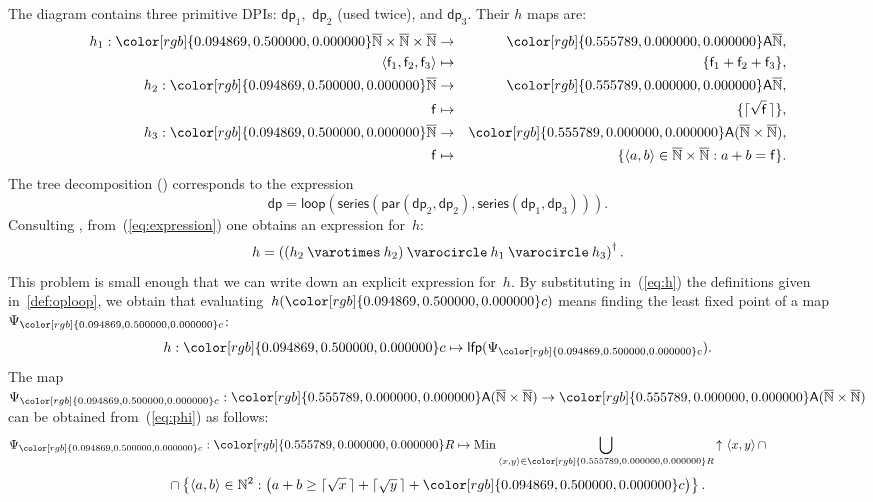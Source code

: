 \documentclass[twocolumn,english]{IEEEtran}
\theoremstyle{definition}
\theoremstyle{plain}
\theoremstyle{definition}
\theoremstyle{remark}
\theoremstyle{definition}
\theoremstyle{plain}
\theoremstyle{plain}
\newcommand{\aword}[1]{\mathsf{#1}}
\newcommand{\vmath}[1]{\aword{#1}}
\DeclareMathOperator*{\Min}{Min}
\newcommand{\lfp}{\vmath{lfp}}
\newcommand{\antichains}{\vmath{A}}
\newcommand{\upit}{{\uparrow\,}}
\newcommand{\ftor}{{h}}
\newcommand{\fun}{\vmath{f}}
\newcommand{\dprob}{\vmath{dp}}
\newcommand{\dpseries}{\vmath{series}}
\newcommand{\dppar}{\vmath{par}}
\newcommand{\dploop}{\vmath{loop}}
\newcommand{\oploop}{\dagger}
\newcommand{\opseries}{\mathbin{\varocircle}}
\newcommand{\oppar}{\mathbin{\varotimes}}
\newcommand{\colR}{\color[rgb]{0.555789,0.000000,0.000000}}
\newcommand{\colF}{\color[rgb]{0.094869,0.500000,0.000000}}
\newcommand{\R}[1]{{\colR #1}}
\newcommand{\F}[1]{{\colF #1}}
\begin{document}
\noindent The diagram contains three primitive DPIs: $\dprob_{1},$
$\dprob_{2}$ (used twice), and $\dprob_{3}$. Their $\ftor$ maps
are:
\begin{eqnarray*}
\ftor_{1}:{\colF\overline{\mathbb{N}}\times\overline{\mathbb{N}}\times\overline{\mathbb{N}}} & \rightarrow & {\colR\antichains\overline{\mathbb{N}}},\\
\left\langle \fun_{1},\fun_{2},\fun_{3}\right\rangle  & \mapsto & \{\fun_{1}+\fun_{2}+\fun_{3}\},\\
\ftor_{2}:{\colF\overline{\mathbb{N}}} & \rightarrow & {\colR\antichains\overline{\mathbb{N}}},\\
\fun & \mapsto & \{\lceil\sqrt{\fun}\,\rceil\},\\
\ftor_{3}:{\colF\overline{\mathbb{N}}} & \rightarrow & {\colR\antichains(\overline{\mathbb{N}}\times\overline{\mathbb{N}})},\\
\fun & \mapsto & \{\left\langle a,b\right\rangle \in\overline{\mathbb{N}}\times\overline{\mathbb{N}}:a+b=\fun\}.
\end{eqnarray*}
The tree decomposition () corresponds to
the expression
\begin{equation}
\dprob=\dploop(\dpseries(\dppar(\dprob_{2},\dprob_{2}),\dpseries(\dprob_{1},\dprob_{3}))).\label{eq:expression}
\end{equation}
Consulting , from~(\ref{eq:expression})
one obtains an expression for~$\ftor$:
\begin{equation}
\ftor=\left((\ftor_{2}\oppar\ftor_{2})\opseries\ftor_{1}\opseries\ftor_{3}\right)^{\oploop}.\label{eq:h}
\end{equation}
This problem is small enough that we can write down an explicit expression
for~$\ftor$. By substituting in~(\ref{eq:h}) the definitions given
in~\textendash \ref{def:oploop}, we obtain that
evaluating~$\ftor(\F{c})$ means finding the least fixed point of
a map~$\Psi_{\F{c}}$: 
\[
\ftor:\F{c}\mapsto\lfp(\Psi_{\F{c}}).
\]
The map $\Psi_{\F{c}}:\R{\antichains(\overline{\mathbb{N}}\times\overline{\mathbb{N}})}\rightarrow\R{\antichains(\overline{\mathbb{N}}\times\overline{\mathbb{N}})}$
can be obtained from~(\ref{eq:phi}) as follows:
\[
\Psi_{\F{c}}:\R{R}\mapsto\Min\bigcup_{\left\langle x,y\right\rangle \in\R{R}}\upit\left\langle x,y\right\rangle \cap\qquad\qquad\qquad\qquad
\]
\[
\cap\left\{ \left\langle a,b\right\rangle \in\mathbb{N}^{2}:\left(a+b\geq\lceil\sqrt{x}\,\rceil+\lceil\sqrt{y}\,\rceil+\F{c}\right)\right\} .
\]
\end{document}
